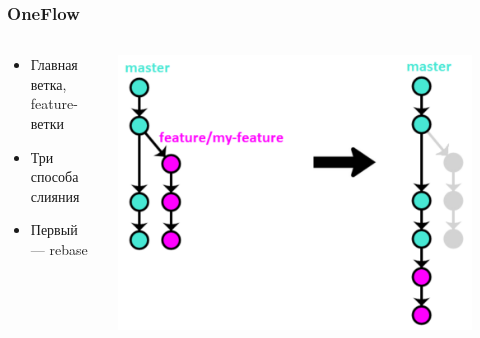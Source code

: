 \documentclass{../../slides-style}
\begin{document}
    \begin{frame}
        \frametitle{OneFlow}
        \begin{columns}
            \begin{column}{0.4\textwidth}
                \begin{itemize}
                    \item Главная ветка, feature-ветки
                    \item Три способа слияния
                    \item Первый~--- rebase
                \end{itemize}
            \end{column}
            \begin{column}{0.6\textwidth}
                \begin{center}
                    \includegraphics[width=0.9\textwidth]{oneflow1.png}
                \end{center}
            \end{column}
        \end{columns}
    \end{frame}
\end{document}
